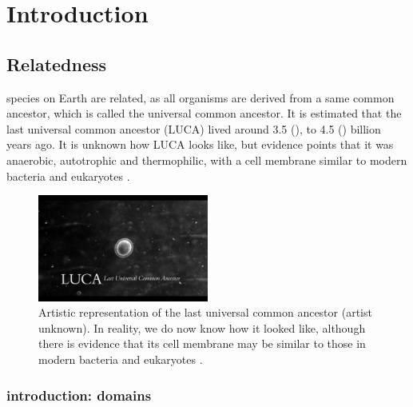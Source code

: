 \chapter{Introduction}
\label{chapter_introduction}
\newpage

\noindent

\section{Relatedness}

 species on Earth are related, as all organisms are derived from
a same common ancestor, which is called the universal common ancestor. 
It is estimated that the
last universal common ancestor (LUCA) lived around 
3.5 (\cite{doolittle2000uprooting, glansdorff2008last}), 
to 4.5 (\cite{betts2018integrated}) billion years
ago.
It is unknown how LUCA looks like, but evidence points that
it was anaerobic, autotrophic and thermophilic, with a cell membrane 
similar to modern bacteria and 
eukaryotes \cite{akanuma2019common, weiss2016physiology}.

\begin{figure}[H]
  \includegraphics[width=0.5\textwidth]{luca.png}
  \caption{
    Artistic representation of the last universal common ancestor (artist
    unknown). In reality, we do now know how it looked like, although
    there is evidence that its cell membrane may be similar
    to those in modern bacteria and eukaryotes \cite{akanuma2019common}.
  }
  \label{fig:luca}
\end{figure}

\subsection{introduction: domains}

